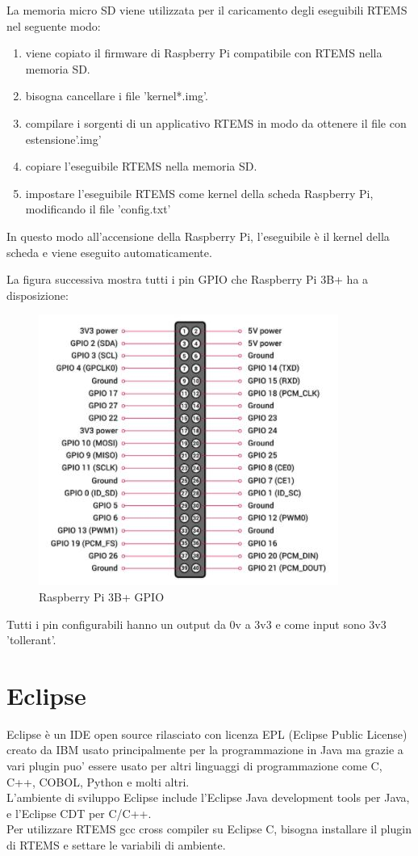 \documentclass[12pt, a4paper, titlepage, oneside]{book}
\begin{document}
\begin{flushleft}
La memoria micro SD viene utilizzata per il caricamento degli eseguibili RTEMS nel seguente modo:
\begin{enumerate}
    \item viene copiato il firmware di Raspberry Pi compatibile con RTEMS nella memoria SD.
    \item bisogna cancellare i file 'kernel*.img'. 
    \item compilare i sorgenti di un applicativo RTEMS in modo da ottenere il file con estensione'.img' 
    \item copiare l'eseguibile RTEMS nella memoria SD.
    \item impostare l'eseguibile RTEMS come kernel della scheda Raspberry Pi, modificando il file 'config.txt'
\end{enumerate}
In questo modo all'accensione della Raspberry Pi, l'eseguibile è il kernel della scheda e viene eseguito automaticamente.

\newpage
La figura successiva mostra tutti i pin GPIO che Raspberry Pi 3B+ ha a disposizione:
\begin{figure}[h]
    \centering
    \includegraphics[scale = 1.50]{RPi3B_GPIO.JPG}
    \caption{Raspberry Pi 3B+ GPIO}
    \label{fig:RPi3B_GPIO}
\end{figure}

Tutti i pin configurabili hanno un output da 0v a 3v3 e come input sono 3v3 'tollerant'.


\newpage

\section{Eclipse}
Eclipse è un IDE open source rilasciato con licenza EPL (Eclipse Public License) creato da IBM usato principalmente per la programmazione in Java ma grazie a vari plugin puo' essere usato per altri linguaggi di programmazione come C, C++, COBOL, Python e molti altri. \\
L'ambiente di sviluppo Eclipse include l'Eclipse Java development tools per Java, e l'Eclipse CDT per C/C++. \\
Per utilizzare RTEMS gcc cross compiler su Eclipse C, bisogna installare il plugin di RTEMS e settare le variabili di ambiente.

\end{flushleft}
\end{document}
